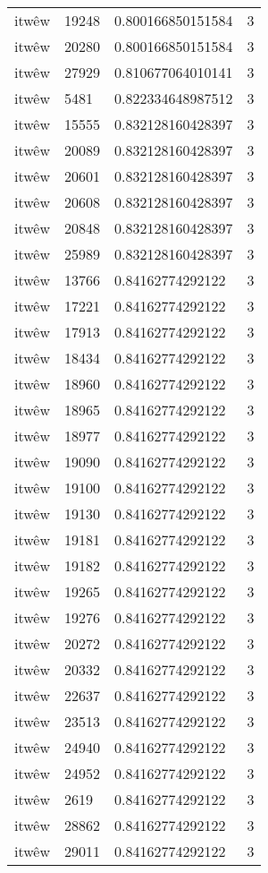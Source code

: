 \begin{longtable}{llll}
itwêw & 19248 & 0.800166850151584 & 3 \\
itwêw & 20280 & 0.800166850151584 & 3 \\
itwêw & 27929 & 0.810677064010141 & 3 \\
itwêw & 5481 & 0.822334648987512 & 3 \\
itwêw & 15555 & 0.832128160428397 & 3 \\
itwêw & 20089 & 0.832128160428397 & 3 \\
itwêw & 20601 & 0.832128160428397 & 3 \\
itwêw & 20608 & 0.832128160428397 & 3 \\
itwêw & 20848 & 0.832128160428397 & 3 \\
itwêw & 25989 & 0.832128160428397 & 3 \\
itwêw & 13766 & 0.84162774292122 & 3 \\
itwêw & 17221 & 0.84162774292122 & 3 \\
itwêw & 17913 & 0.84162774292122 & 3 \\
itwêw & 18434 & 0.84162774292122 & 3 \\
itwêw & 18960 & 0.84162774292122 & 3 \\
itwêw & 18965 & 0.84162774292122 & 3 \\
itwêw & 18977 & 0.84162774292122 & 3 \\
itwêw & 19090 & 0.84162774292122 & 3 \\
itwêw & 19100 & 0.84162774292122 & 3 \\
itwêw & 19130 & 0.84162774292122 & 3 \\
itwêw & 19181 & 0.84162774292122 & 3 \\
itwêw & 19182 & 0.84162774292122 & 3 \\
itwêw & 19265 & 0.84162774292122 & 3 \\
itwêw & 19276 & 0.84162774292122 & 3 \\
itwêw & 20272 & 0.84162774292122 & 3 \\
itwêw & 20332 & 0.84162774292122 & 3 \\
itwêw & 22637 & 0.84162774292122 & 3 \\
itwêw & 23513 & 0.84162774292122 & 3 \\
itwêw & 24940 & 0.84162774292122 & 3 \\
itwêw & 24952 & 0.84162774292122 & 3 \\
itwêw & 2619 & 0.84162774292122 & 3 \\
itwêw & 28862 & 0.84162774292122 & 3 \\
itwêw & 29011 & 0.84162774292122 & 3 \\

\end{longtable}
